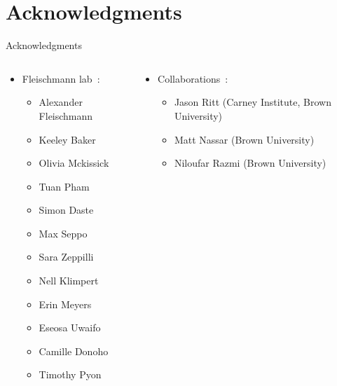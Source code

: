 \documentclass[bigger]{beamer}
\begin{document}
\section*{Acknowledgments}
\label{sec:org34ca1b0}
{%
\begin{frame}{Acknowledgments}
    \vspace{1em}
    \begin{columns}[T]
        \begin{column}{0.5\textwidth}
            \begin{itemize}
                \small
                \item Fleischmann lab~:
                \begin{itemize}
                    \tiny
                    \item Alexander Fleischmann
                    \item Keeley Baker
                    \item Olivia Mckissick
                    \item Tuan Pham
                    \item Simon Daste
                    \item Max Seppo
                    \item Sara Zeppilli
                    \item Nell Klimpert
                    \item Erin Meyers
                    \item Eseosa Uwaifo
                    \item Camille Donoho
                    \item Timothy Pyon
                \end{itemize}
            \end{itemize}
        \end{column}

        \begin{column}{0.5\textwidth}
            \begin{itemize}
                \small
                \item Collaborations~:
                \begin{itemize}
                    \tiny
                    \item Jason Ritt (Carney Institute, Brown University)
                    \item Matt Nassar (Brown University)
                    \item Niloufar Razmi (Brown University)
                \end{itemize}
            \end{itemize}
        \end{column}
    \end{columns}
\end{frame}
}
\end{document}
